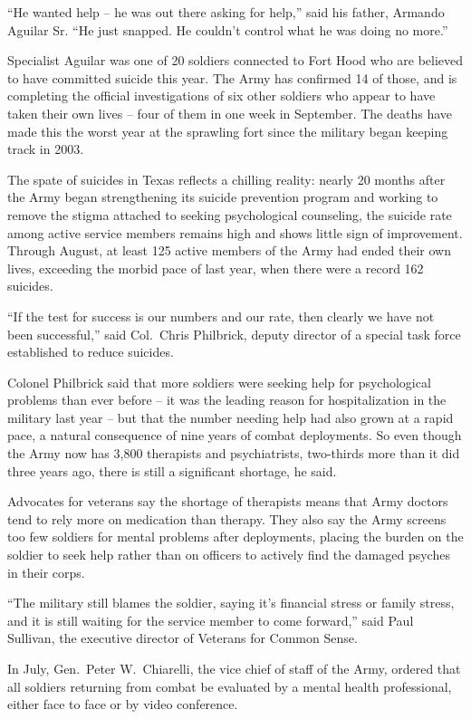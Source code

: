 ﻿\documentclass[12pt]{article}
\begin{document}
``He wanted help -- he was out there asking for help,'' said his father, Armando Aguilar Sr. ``He
just snapped. He couldn't control what he was doing no more.''

Specialist Aguilar was one of 20 soldiers connected to Fort Hood who are believed to have committed
suicide this year. The Army has confirmed 14 of those, and is completing the official investigations
of six other soldiers who appear to have taken their own lives -- four of them in one week in
September. The deaths have made this the worst year at the sprawling fort since the military began
keeping track in 2003.

The spate of suicides in Texas reflects a chilling reality: nearly 20 months after the Army began
strengthening its suicide prevention program and working to remove the stigma attached to seeking
psychological counseling, the suicide rate among active service members remains high and shows
little sign of improvement. Through August, at least 125 active members of the Army had ended their
own lives, exceeding the morbid pace of last year, when there were a record 162 suicides.

``If the test for success is our numbers and our rate, then clearly we have not been successful,''
said Col.~Chris Philbrick, deputy director of a special task force established to reduce suicides.

Colonel Philbrick said that more soldiers were seeking help for psychological problems than ever
before -- it was the leading reason for hospitalization in the military last year -- but that the
number needing help had also grown at a rapid pace, a natural consequence of nine years of combat
deployments. So even though the Army now has 3,800 therapists and psychiatrists, two-thirds more
than it did three years ago, there is still a significant shortage, he said.

Advocates for veterans say the shortage of therapists means that Army doctors tend to rely more on
medication than therapy. They also say the Army screens too few soldiers for mental problems after
deployments, placing the burden on the soldier to seek help rather than on officers to actively find
the damaged psyches in their corps.

``The military still blames the soldier, saying it's financial stress or family stress, and it is
still waiting for the service member to come forward,'' said Paul Sullivan, the executive director
of Veterans for Common Sense.

In July, Gen.~Peter W.~Chiarelli, the vice chief of staff of the Army, ordered that all soldiers
returning from combat be evaluated by a mental health professional, either face to face or by video
conference.
\end{document}
